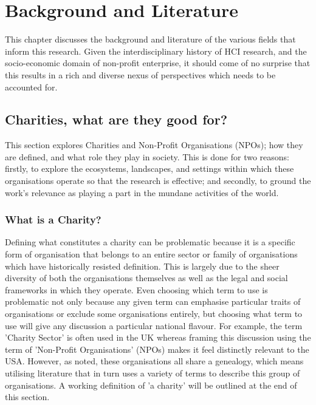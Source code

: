 \chapter{Background and Literature}
\label{sec:related}

This chapter discusses the background and literature of the various fields that inform this research. Given the interdisciplinary history of HCI research, and the socio-economic domain of non-profit enterprise, it should come of no surprise that this results in a rich and diverse nexus of perspectives which needs to be accounted for.

\section{Charities, what are they good for?}
This section explores Charities and Non-Profit Organisations (NPOs); how they are defined, and what role they play in society. This is done for two reasons: firstly, to explore the ecosystems, landscapes, and settings within which these organisations operate so that the research is effective; and secondly, to ground the work's relevance as playing a part in the mundane activities of the world.

\subsection{What is a Charity?}

Defining what constitutes a charity can be problematic because it is a specific form of organisation that belongs to an entire sector or family of organisations which have historically resisted definition. This is largely due to the sheer diversity of both the organisations themselves as well as the legal and social frameworks in which they operate. Even choosing which term to use is problematic not only because any given term can emphasise particular traits of organisations or exclude some organisations entirely, but choosing what term to use will give any discussion a particular national flavour. For example, the term 'Charity Sector' is often used in the UK whereas framing this discussion using the term of 'Non-Profit Organisations' (NPOs) makes it feel distinctly relevant to the USA. However, as noted, these organisations all share a genealogy, which means utilising literature that in turn uses a variety of terms to describe this group of organisations. A working definition of 'a charity' will be outlined at the end of this section.

